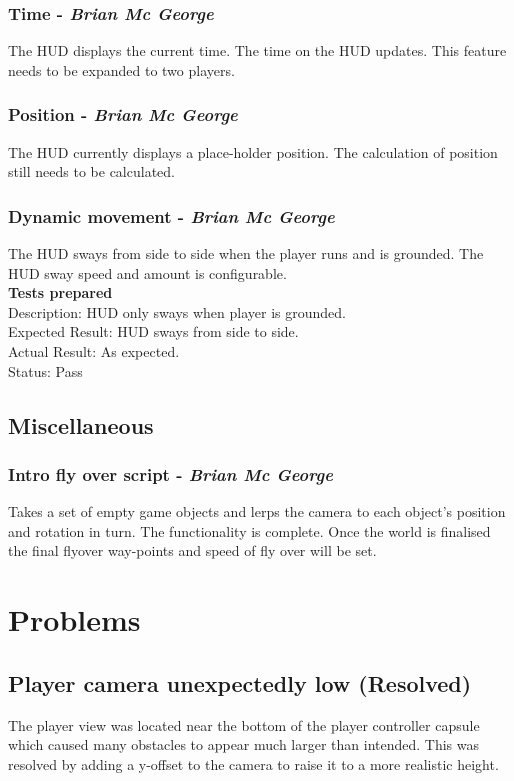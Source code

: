 \documentclass[a4paper,10pt]{article}
\begin{document}
\subsubsection{Time - \textit{Brian Mc George}}
The HUD displays the current time. The time on the HUD updates. This feature needs to be expanded to two players.
\subsubsection{Position - \textit{Brian Mc George}}
The HUD currently displays a place-holder position. The calculation of position still needs to be calculated.
\subsubsection{Dynamic movement - \textit{Brian Mc George}}
The HUD sways from side to side when the player runs and is grounded. The HUD sway speed and amount is configurable.
\smallskip\\\textbf{Tests prepared}\\
Description: HUD only sways when player is grounded.\\
Expected Result: HUD sways from side to side.\\
Actual Result: As expected.\\
Status: Pass

\subsection{Miscellaneous}
\subsubsection{Intro fly over script - \textit{Brian Mc George}}
Takes a set of empty game objects and lerps the camera to each object's position and rotation in turn. The functionality is complete. Once the world is finalised the final flyover way-points and speed of fly over will be set.

\section{Problems}
\subsection{Player camera unexpectedly low (Resolved)}
The player view was located near the bottom of the player controller capsule which caused many obstacles to appear much larger than intended. This was resolved by adding a y-offset to the camera to raise it to a more realistic height.
\end{document}

